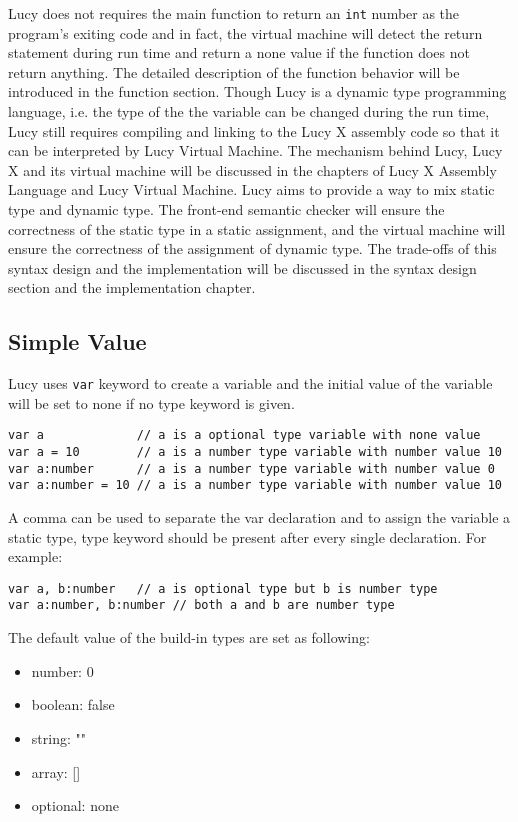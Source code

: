 Lucy does not requires the main function to return an \texttt{int} number as the program's exiting code and in fact, the virtual machine will detect the return statement during run time and return a none value if the function does not return anything. The detailed description of the function behavior will be introduced in the function section. Though Lucy is a dynamic type programming language, i.e. the type of the the variable can be changed during the run time, Lucy still requires compiling and linking to the Lucy X assembly code so that it can be interpreted by Lucy Virtual Machine. The mechanism behind Lucy, Lucy X and its virtual machine will be discussed in the chapters of Lucy X Assembly Language and Lucy Virtual Machine. Lucy aims to provide a way to mix static type and dynamic type. The front-end semantic checker will ensure the correctness of the static type in a static assignment, and the virtual machine will ensure the correctness of the assignment of dynamic type. The trade-offs of this syntax design and the implementation will be discussed in the syntax design section and the implementation chapter.

\subsection{Simple Value}
Lucy uses \texttt{var} keyword to create a variable and the initial value of the variable will be set to none if no type keyword is given.
\begin{lstlisting}
var a             // a is a optional type variable with none value
var a = 10        // a is a number type variable with number value 10
var a:number      // a is a number type variable with number value 0
var a:number = 10 // a is a number type variable with number value 10
\end{lstlisting}
A comma can be used to separate the var declaration and to assign the variable a static type, type keyword should be present after every single declaration. For example:
\begin{lstlisting}
var a, b:number   // a is optional type but b is number type
var a:number, b:number // both a and b are number type
\end{lstlisting}
The default value of the build-in types are set as following:
\begin{itemize}
  \item number: 0
  \item boolean: false
  \item string: ""
  \item array: []
  \item optional: none
\end{itemize}

